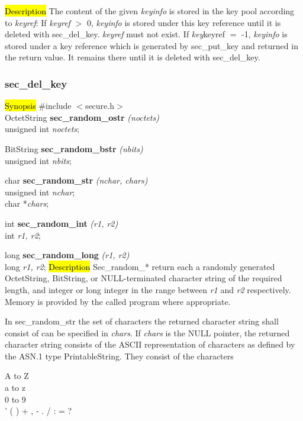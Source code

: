 
\hl{Description}
The content of the given {\em keyinfo} is stored in the key pool according to {\em keyref}: 
\be
\m If {\em keyref} $>$ 0, {\em keyinfo} is stored under this key reference until it is
   deleted with sec\_del\_key. {\em keyref} must not exist.
\m If {\em key}\pf keyref $=$ -1, {\em keyinfo} is stored under a key reference which is generated 
   by sec\_put\_key and returned in the return value. It remains there until it is deleted
   with sec\_del\_key.
\ee

\subsubsection{sec\_del\_key}
\label{random}
\hl{Synopsis}
\#include $<$secure.h$>$ \\ [0.5cm]
OctetString {\bf *sec\_random\_ostr} {\em (noctets)} \\
unsigned int {\em noctets}; 

BitString {\bf *sec\_random\_bstr} {\em (nbits)} \\
unsigned int {\em nbits}; 

char {\bf *sec\_random\_str} {\em (nchar, chars)} \\
unsigned int {\em nchar}; \\
char *{\em chars}; 

int {\bf sec\_random\_int} {\em (r1, r2)} \\
int {\em r1, r2}; 

long {\bf sec\_random\_long} {\em (r1, r2)} \\
long {\em r1, r2};
\hl{Description}
Sec\_random\_* return each a randomly generated OctetString, BitString, or NULL-terminated
character string of the required length, and integer or long integer in the range between
{\em r1} and {\em r2} respectively. Memory is provided by the called program
where appropriate. 

In sec\_random\_str the set of characters the returned character string shall consist of can
be specified in {\em chars}. If {\em chars} is the NULL pointer, the returned character string
consists of the ASCII representation of characters as defined by the ASN.1 type
PrintableString.
They consist of the characters
\begin{center}
{\small
A to Z \\
a to z \\
0 to 9 \\
' ( ) + , - . / : = ?  
}
\end {center}

